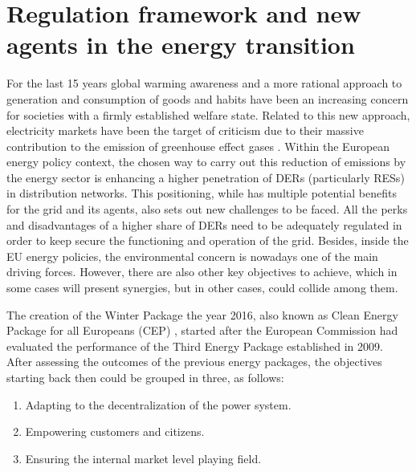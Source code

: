\section{Regulation framework and new agents in the energy transition}
For the last 15 years global warming awareness and a more rational approach to generation and consumption of goods and habits have been an increasing concern for societies with a firmly established welfare state. Related to this new approach, electricity markets have been the target of criticism due to their massive contribution to the emission of greenhouse effect gases \cite{Hancher2017}. Within the European energy policy context, the chosen way to carry out this reduction of emissions by the energy sector is enhancing a higher penetration of DERs (particularly RESs) in distribution networks. This positioning, while has multiple potential benefits for the grid and its agents, also sets out new challenges to be faced.
All the perks and disadvantages of a higher share of DERs need to be adequately regulated in order to keep secure the functioning and operation of the grid. Besides, inside the EU energy policies, the environmental concern is nowadays one of the main driving forces. However, there are also other key objectives to achieve, which in some cases will present synergies, but in other cases, could collide among them. 

The creation of the Winter Package the year 2016, also known as Clean Energy Package for all Europeans (CEP) \cite{validzic2017clean}, started after the European Commission had evaluated the performance of the Third Energy Package established in 2009.  After assessing the outcomes of the previous energy packages, the objectives starting back then could be grouped in three, as follows: 
\begin{enumerate}
\item Adapting to the decentralization of the power system. 
\item Empowering customers and citizens. 
\item Ensuring the internal market level playing field. 
\end{enumerate}

